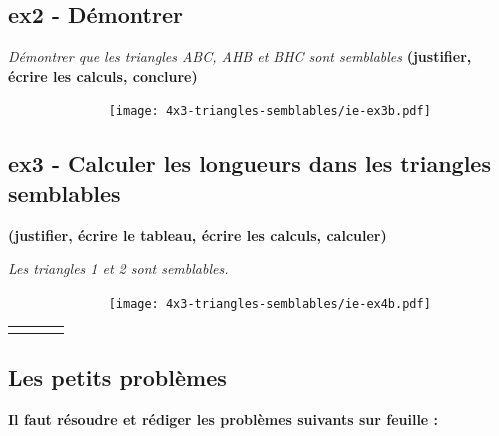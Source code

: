 \begin{minipage}[t]{0.55\textwidth}
  \subsection*{ex2 - Démontrer}
  \textit{Démontrer que les triangles ABC, AHB et BHC sont semblables}
  \textbf{(justifier, écrire les calculs, conclure)}
  \begin{figure}[H]
        \centering
        \texttt{[image: 4x3-triangles-semblables/ie-ex3b.pdf]}
  \end{figure}
\end{minipage}
\begin{minipage}[t]{0.4\textwidth}
  \Pointilles[14]
\end{minipage}

\newpage

\subsection*{ex3 - Calculer les longueurs dans les triangles semblables}
\textbf{(justifier, écrire le tableau, écrire les calculs, calculer)} \newline
\begin{minipage}[t]{0.45\textwidth}
  \textit{Les triangles 1 et 2 sont semblables.} 
  \begin{figure}[H]
        \centering
        \texttt{[image: 4x3-triangles-semblables/ie-ex4b.pdf]}
  \end{figure}
\end{minipage}
\begin{minipage}[t]{0.55\textwidth}
  \begin{tabular}{|c|c|c|c|}
    \hline
    \phantom{$\dfrac{azerty}{1}$} & \phantom{azerty}  & \phantom{azerty} & \phantom{azerty} \\ \hline
    \phantom{$\dfrac{azerty}{1}$} & \phantom{azerty}  & \phantom{azerty} & \phantom{azerty} \\   \hline
  \end{tabular}

  \Pointilles[6]
\end{minipage}


\subsection*{Les petits problèmes}
\textbf{Il faut résoudre et rédiger les problèmes suivants sur feuille :} 

